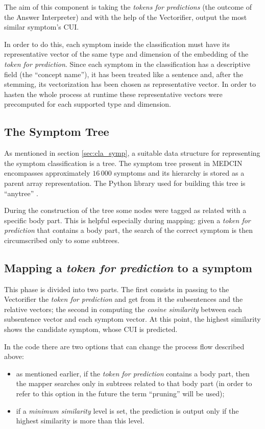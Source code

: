 The aim of this component is taking the \textit{tokens for predictions} (the outcome of the Answer Interpreter) and with the help of the Vectorifier, output the most similar symptom's CUI.

In order to do this, each symptom inside the classification must have its representative vector of the same type and dimension of the embedding of the \textit{token for prediction}. Since each symptom in the classification has a descriptive field (the ``concept name''), it has been treated like a sentence and, after the stemming, its vectorization has been chosen as representative vector. In order to hasten the whole process at runtime these representative vectors were precomputed for each supported type and dimension.

\subsection{The Symptom Tree}
As mentioned in section \ref{sec:cla_symp}, a suitable data structure for representing the symptom classification is a tree. The symptom tree present in MEDCIN encompasses approximately $16\,000$ symptoms and its hierarchy is stored as a parent array representation. The Python library used for building this tree is ``anytree'' \cite{anytree}.

During the construction of the tree some nodes were tagged as related with a specific body part. This is helpful especially during mapping: given a \textit{token for prediction} that contains a body part, the search of the correct symptom is then circumscribed only to some subtrees.

\subsection{Mapping a \textit{token for prediction} to a symptom}
This phase is divided into two parts. The first consists in passing to the Vectorifier the \textit{token for prediction} and get from it the subsentences and the relative vectors; the second in computing the \textit{cosine similarity} between each subsentence vector and each symptom vector. At this point, the highest similarity shows the candidate symptom, whose CUI is predicted.

In the code there are two options that can change the process flow described above:
\begin{itemize}
  \item as mentioned earlier, if the \textit{token for prediction} contains a body part, then the mapper searches only in subtrees related to that body part (in order to refer to this option in the future the term ``pruning'' will be used);
  \item if a \textit{minimum similarity} level is set, the prediction is output only if the highest similarity is more than this level. 
\end{itemize}
